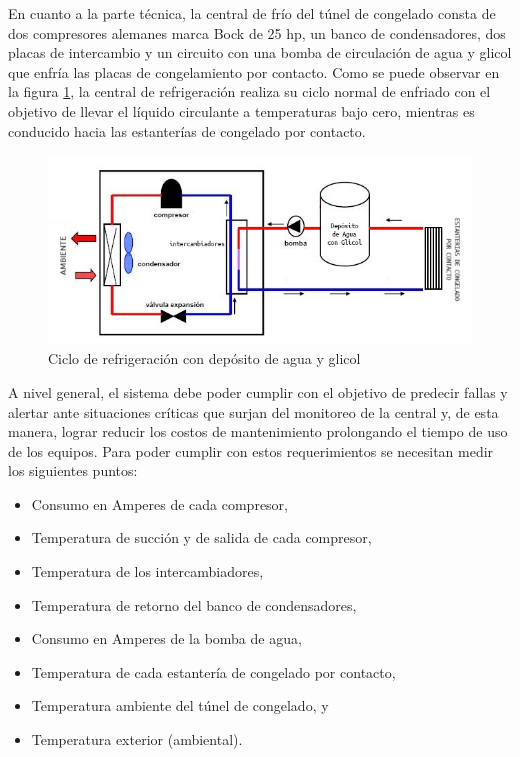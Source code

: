 \documentclass[
11pt, %
]{charter}
\begin{document}
En cuanto a la parte técnica, la central de frío del túnel de congelado consta de dos compresores alemanes marca Bock de 25 hp, un banco de condensadores, dos placas de intercambio y un circuito con una bomba de circulación de agua y glicol que enfría las placas de congelamiento por contacto. Como se puede observar en la figura \ref{fig:circuito_tunel}, la central de refrigeración realiza su ciclo normal de enfriado con el objetivo de llevar el líquido circulante a temperaturas bajo cero, mientras es conducido hacia las estanterías de congelado por contacto.

\begin{figure}[htpb]
\centering 
\includegraphics[width=.7\textwidth]{./Figuras/circuito_tunel.png}
\caption{Ciclo de refrigeración con depósito de agua y glicol}
\label{fig:circuito_tunel}
\end{figure}

A nivel general, el sistema debe poder cumplir con el objetivo de predecir fallas y alertar ante situaciones críticas que surjan del monitoreo de la central y, de esta manera, lograr reducir los costos de mantenimiento prolongando el tiempo de uso de los equipos. Para poder cumplir con estos requerimientos se necesitan medir los siguientes puntos:
\begin{itemize}
	\item Consumo en Amperes de cada compresor,
	\item Temperatura de succión y de salida de cada compresor,
	\item Temperatura de los intercambiadores,	
	\item Temperatura de retorno del banco de condensadores,
	\item Consumo en Amperes de la bomba de agua,
	\item Temperatura de cada estantería de congelado por contacto,
	\item Temperatura ambiente del túnel de congelado, y
	\item Temperatura exterior (ambiental).
\end{itemize}
\end{document}
